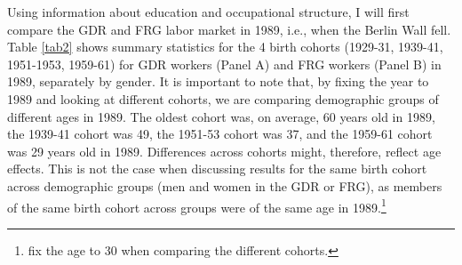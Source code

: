 \begin{Article}
\begin{refsection}[Spitz]
Using information about education and occupational structure, I will first compare the GDR and FRG labor market in 1989, i.e., when the Berlin Wall fell. Table \ref{tab2} shows summary statistics for the 4 birth cohorts (1929-31, 1939-41, 1951-1953, 1959-61) for GDR workers (Panel A) and FRG workers (Panel B) in 1989, separately by gender. It is important to note that, by fixing the year to 1989 and looking at different cohorts, we are comparing demographic groups of different ages in 1989. The oldest cohort was, on average, 60 years old in 1989, the 1939-41 cohort was 49, the 1951-53 cohort was 37, and the 1959-61 cohort was 29 years old in 1989. Differences across cohorts might, therefore, reflect age effects. This is not the case when discussing results for the same birth cohort across demographic groups (men and women in the GDR or FRG), as members of the same birth cohort across groups were of the same age in 1989.\footnote{\cite{HuininkSolga1994} fix the age to 30 when comparing the different cohorts.}


\end{refsection}
\end{Article}

